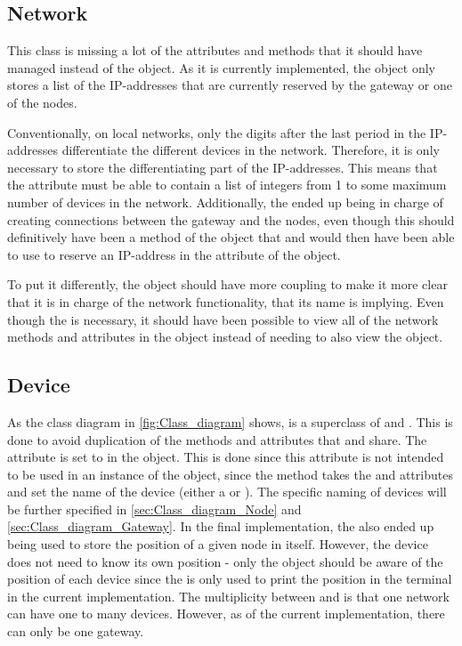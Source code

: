 \subsection{Network}
This class is missing a lot of the attributes and methods that it should have managed instead of the  object. As it is currently implemented, the  object only stores a list of the IP-addresses that are currently reserved by the gateway or one of the nodes.\bigbreak

\noindent Conventionally, on local networks, only the digits after the last period in the IP-addresses differentiate the different devices in the network. Therefore, it is only necessary to store the differentiating part of the IP-addresses. This means that the attribute  must be able to contain a list of integers from 1 to some maximum number of devices in the network. Additionally, the  ended up being in charge of creating connections between the gateway and the nodes, even though this should definitively have been a method of the  object that  and  would then have been able to use to reserve an IP-address in the  attribute of the  object.\newline

\noindent To put it differently, the  object should have more coupling to make it more clear that it is in charge of the network functionality, that its name is implying. Even though the  is necessary, it should have been possible to view all of the network methods and attributes in the  object instead of needing to also view the  object.

\subsection{Device}
As the class diagram in \autoref{fig:Class_diagram} shows,  is a superclass of  and . This is done to avoid duplication of the methods and attributes that  and  share. The attribute  is set to  in the  object. This is done since this attribute is not intended to be used in an instance of the  object, since the  method takes the  and  attributes and set the name of the device (either a  or ). The specific naming of devices will be further specified in \autoref{sec:Class_diagram_Node} and \autoref{sec:Class_diagram_Gateway}. In the final implementation, the  also ended up being used to store the position of a given node in itself. However, the device does not need to know its own position - only the  object should be aware of the position of each device since the  is only used to print the position in the terminal in the current implementation. The multiplicity between  and  is that one network can have one to many devices. However, as of the current implementation, there can only be one gateway.

